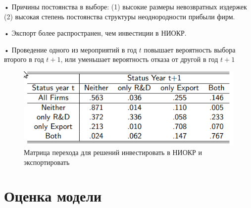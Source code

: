 \documentclass[c, dvipsnames]{beamer}  %
\begin{document}
\begin{frame}[shrink=3]
\frametitle{\insertsection} 

• Причины постоянства в выборе: (1) высокие размеры невозвратных издержек (2) высокая степень
постоянства структуры неоднородности  прибыли фирм.

• Экспорт более распространен, чем инвестиции в НИОКР.

• Проведение одного из мероприятий в год $t$ повышает вероятность выбора второго в год $t + 1$, или уменьшает вероятность отказа от другой в год  $t + 1$


\begin{figure}
	\centering
	\includegraphics[width=0.7\linewidth]{screenshot002}
	\caption{Матрица перехода для решений инвестировать в НИОКР и экспортировать }
	\label{fig:screenshot002}
\end{figure}



\end{frame}




\section{Оценка модели}
\end{document}
